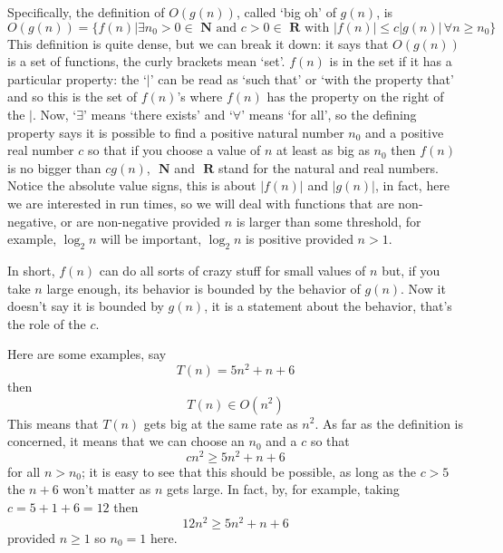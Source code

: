 \documentclass[11pt,a4paper]{scrartcl}
\begin{document}
Specifically, the definition of $O(g(n))$, called \lq{}big oh\rq{} of
$g(n)$, is
\begin{equation}
O(g(n))=\{f(n)| \exists n_0>0\in \textbf{ N}\mbox{ and }c>0\in \textbf{ R}\mbox{ with }|f(n)|\le c|g(n)|\,\forall n\ge n_0\}
\end{equation}
This definition is quite dense, but we can break it down: it says that
$O(g(n))$ is a set of functions, the curly brackets mean
\lq{}set\rq{}. $f(n)$ is in the set if it has a particular
property: the \lq$|$\rq{} can be read as \lq{}such that\rq{} or
\lq{}with the property that\rq{} and so this is the set of $f(n)$'s
where $f(n)$ has the property on the right of the $|$. Now,
\lq{}$\exists$\rq{} means \lq{}there exists\rq{} and
\lq{}$\forall$\rq{} means \lq{}for all\rq{}, so the defining property
says it is possible to find a positive natural number $n_0$ and a
positive real number $c$ so that if you choose a value of $n$ at
least as big as $n_0$ then $f(n)$ is no bigger than $cg(n)$, $\textbf{ N}$
and $\textbf{ R}$ stand for the natural and real numbers. Notice the
absolute value signs, this is about $|f(n)|$ and $|g(n)|$, in fact,
here we are interested in run times, so we will deal with functions
that are non-negative, or are non-negative provided $n$ is larger than
some threshold, for example, $\log_2{n}$ will be important,
$\log_2{n}$ is positive provided $n>1$.

In short, $f(n)$ can do all sorts of crazy stuff for small values of
$n$ but, if you take $n$ large enough, its behavior is bounded by the
behavior of $g(n)$. Now it doesn't say it is bounded by $g(n)$, it is
a statement about the behavior, that's the role of the $c$.

Here are some examples, say 
\begin{equation}
T(n)=5n^2+n+6
\end{equation}
then 
\begin{equation}
T(n)\in O(n^2)
\end{equation}
This means that $T(n)$ gets big at the same rate as $n^2$. As far as the definition is concerned, it means that we can choose an $n_0$ and a $c$ so that
\begin{equation}
cn^2\ge 5n^2+n+6
\end{equation}
for all $n>n_0$; it is easy to see that this should be possible, as
long as the $c>5$ the $n+6$ won't matter as $n$ gets large. In fact,
by, for example, taking $c=5+1+6=12$ then
\begin{equation}
12n^2\ge 5n^2+n+6
\end{equation}
provided $n\ge 1$ so $n_0=1$ here. 
\end{document}
